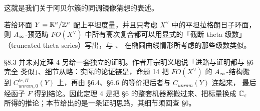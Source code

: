 这就是我们关于阿贝尔簇的同调镜像猜想的表述。

\begin{rmk}
若给环面 $Y=\mathbb{R}^n/\mathbb{Z}^n$ 配上平坦度量，并且只考虑 $X^{\vee}$ 中的平坦拉格朗日子环面，则
$A_{\infty}$-预范畴 $FO(X^{\vee})$ 中所有高次复合都可以用显式的「截断 theta 级数」
（truncated theta series）写出，与 \cite{Ko}、\cite{P1} 在椭圆曲线情形所考虑的那些级数类似。
\end{rmk}

\begin{yizhu}[定理 4 证明的性质]
§8.3 并未对定理 4 另给一套独立的证明。作者开宗明义地说「进路与证明都与 §6 完全
类似」、细节从略：实际的论证链是，命题 14 把 $FO(X^{\vee})$ 的 $A_{\infty}$-结构搬到
$C^{tr,\Pi}_{unram,0}(Y)$ 上，再由 §6.4、§6.6 的等价把后者与 $C_{unram}(Y)$ 连起来，
最后经函子 $F$ 得到结论。因此定理 4 是把 §6 的整套机器照搬过来、把标量换成
$\mathbb{C}_{\varepsilon}$ 所得的推论；本节给出的是一条证明思路，其细节须回查 §6。
\end{yizhu}

